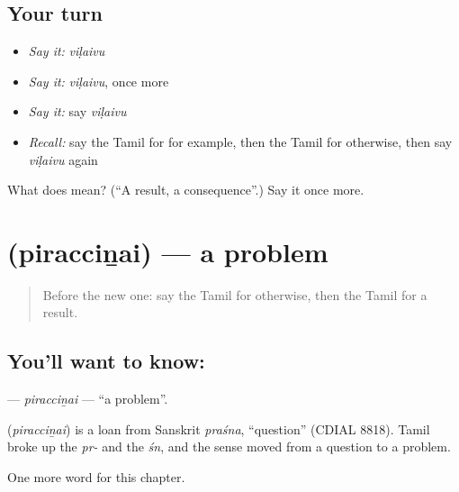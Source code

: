\subsection*{Your turn}
\begin{itemize}
\raggedright
  \item \emph{Say it:} \emph{viḷaivu}
  \item \emph{Say it:} \emph{viḷaivu}, once more
  \item \emph{Say it:} say \emph{viḷaivu}
  \item \emph{Recall:} say the Tamil for for example, then the Tamil for otherwise, then say \emph{viḷaivu} again
\end{itemize}

\begin{tcolorbox}[breakable,colback=teal!4,colframe=teal!35!black,title={Before you move on}]
What does  mean? (\textquotedblleft{}A result, a consequence\textquotedblright{}.) Say it once more.
\end{tcolorbox}
\section[\texorpdfstring{\ta{பிரச்சினை} (piracciṉai)}{பிரச்சினை (piracciṉai)}]{ (piracciṉai) — a problem}

\label{lesson:TA-C177-piraccinai}



\begin{quote}
Before the new one: say the Tamil for otherwise, then the Tamil for a result.
\end{quote}

\subsection*{You'll want to know: }
\textbf{} — \emph{piracciṉai} — \textquotedblleft{}a problem\textquotedblright{}.

\begin{cousinweb}
\textbf{} (\emph{piracciṉai}) is a loan from Sanskrit \emph{praśna}, \textquotedblleft{}question\textquotedblright{} (CDIAL 8818). Tamil broke up the \emph{pr-} and the \emph{śn}, and the sense moved from a question to a problem.
\end{cousinweb}

\begin{grammarlens}[title={What you've built}]
One more word for this chapter.
\end{grammarlens}

